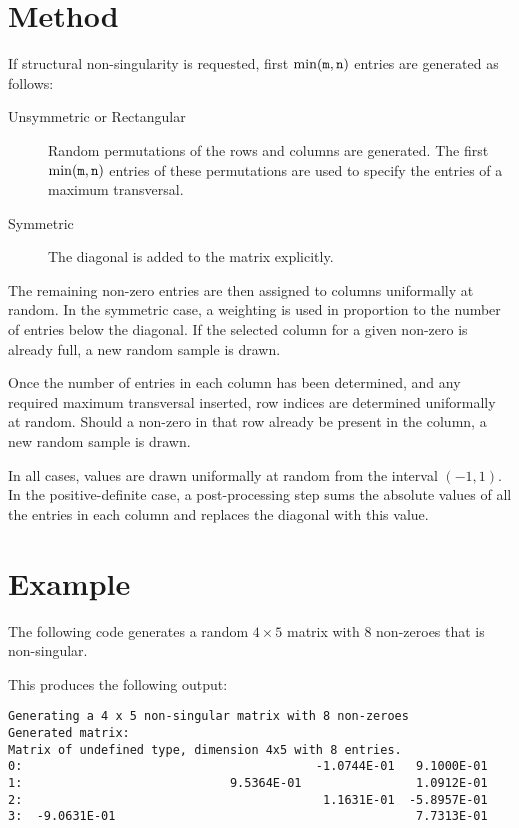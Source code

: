 \section{Method} \label{method}

If structural non-singularity is requested, first $\min({\tt m}, {\tt n})$ entries are generated as follows:
\begin{description}
   \item[Unsymmetric or Rectangular] Random permutations of the rows and
      columns are generated. The first $\min({\tt m}, {\tt n})$ entries of
      these permutations are used to specify the entries of a maximum
      transversal.
   \item[Symmetric] The diagonal is added to the matrix explicitly.
\end{description}

The remaining non-zero entries are then assigned to columns uniformally at
random. In the symmetric case, a weighting is used in proportion to the number of
entries below the diagonal. If the selected column for a given non-zero is 
already full, a new random sample is drawn.

Once the number of entries in each column has been determined, and any required
maximum transversal inserted, row indices are determined uniformally at random.
Should a non-zero in that row already be present in the column, a new random
sample is drawn.

In all cases, values are drawn uniformally at random from the interval $(-1,1)$. In
the positive-definite case, a post-processing step sums the absolute values of
all the entries in each column and replaces the diagonal with this value.


\section{Example} \label{examples}

The following code generates a random $4 \times 5$ matrix with $8$ non-zeroes
that is non-singular.

This produces the following output:
\begin{verbatim}
Generating a 4 x 5 non-singular matrix with 8 non-zeroes
Generated matrix:
Matrix of undefined type, dimension 4x5 with 8 entries.
0:                                         -1.0744E-01   9.1000E-01
1:                             9.5364E-01                1.0912E-01
2:                                          1.1631E-01  -5.8957E-01
3:  -9.0631E-01                                          7.7313E-01
\end{verbatim}

\begin{funders}
\end{funders}

